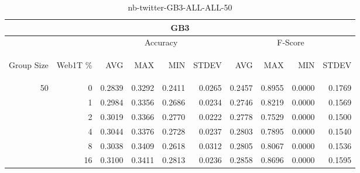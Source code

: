 \begin{center}
\begin{table}[htbp]
\begin{center}
\begin{tabular}{ | r | r | r | r | r | r | r | r | r | r |}
\hline
\multicolumn{10}{|c|}{GB3}\\
\hline
 & & \multicolumn{4}{|c|}{Accuracy} & \multicolumn{4}{|c|}{F-Score}\\ \cline{3-10}
\begin{sideways}Group Size\end{sideways} & \begin{sideways}Web1T \%\end{sideways} & \begin{sideways}AVG\end{sideways} & \begin{sideways}MAX\end{sideways} & \begin{sideways}MIN\end{sideways} & \begin{sideways}STDEV\end{sideways} & \begin{sideways}AVG\end{sideways} & \begin{sideways}MAX\end{sideways} & \begin{sideways}MIN\end{sideways} & \begin{sideways}STDEV\end{sideways}\\
\hline
\multirow{5}{*}{50}
 & 0 & 0.2839 & 0.3292 & 0.2411 & 0.0265 & 0.2457 & 0.8955 & 0.0000 & 0.1769\\ \cline{2-10}
 & 1 & 0.2984 & 0.3356 & 0.2686 & 0.0234 & 0.2746 & 0.8219 & 0.0000 & 0.1569\\ \cline{2-10}
 & 2 & 0.3019 & 0.3366 & 0.2770 & 0.0222 & 0.2778 & 0.7529 & 0.0000 & 0.1500\\ \cline{2-10}
 & 4 & 0.3044 & 0.3376 & 0.2728 & 0.0237 & 0.2803 & 0.7895 & 0.0000 & 0.1540\\ \cline{2-10}
 & 8 & 0.3038 & 0.3409 & 0.2618 & 0.0312 & 0.2805 & 0.8067 & 0.0000 & 0.1536\\ \cline{2-10}
 & 16 & 0.3100 & 0.3411 & 0.2813 & 0.0236 & 0.2858 & 0.8696 & 0.0000 & 0.1595\\ \cline{2-10}
\hline
\end{tabular}
\caption{nb-twitter-GB3-ALL-ALL-50}
\label{table:nb-twitter-GB3-ALL-ALL-50}
\end{center}
\end{table}
\end{center}

